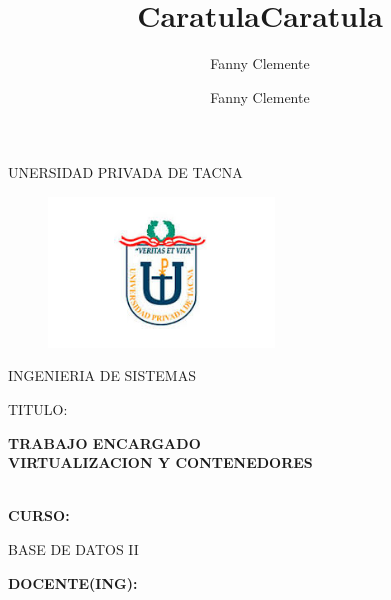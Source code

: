 \documentclass[12pt,letterpaper]{article}
\author{Fanny Clemente}
\title{Caratula}
\begin{document}
\author{Fanny Clemente}
\title{Caratula}

\begin{titlepage}
\begin{center}
\large{UNERSIDAD PRIVADA DE TACNA}\\
\vspace*{-0.025in}
\begin{figure}[htb]
\begin{center}
\includegraphics[width=6cm]{IMAGENES/logo.jpg}
\end{center}
\end{figure}
\vspace*{0.15in}
INGENIERIA DE SISTEMAS  \\

\vspace*{0.5in}
\begin{large}
TITULO:\\
\end{large}

\vspace*{0.1in}
\begin{Large}
\textbf{TRABAJO ENCARGADO} \\



\textbf{VIRTUALIZACION Y CONTENEDORES} \\\\
\end{Large}

\vspace*{0.3in}
\begin{Large}
\textbf{CURSO:} \\
\end{Large}

\vspace*{0.1in}
\begin{large}
BASE DE DATOS II\\
\end{large}

\vspace*{0.3in}
\begin{Large}
\textbf{DOCENTE(ING):} \\
\end{Large}


\end{center}
\end{titlepage}
\end{document}
